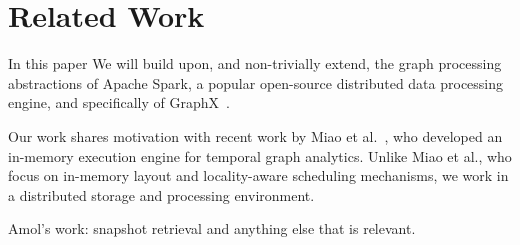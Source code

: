 \section{Related Work}
\label{sec:related}

In this paper We will build upon, and non-trivially extend, the graph
processing abstractions of Apache Spark, a popular open-source
distributed data processing engine, and specifically of
GraphX~\cite{DBLP:conf/osdi/GonzalezXDCFS14}.  

Our work shares motivation with recent work by Miao et
al.~\cite{DBLP:journals/tos/MiaoHLWYZPCC15}, who developed an
in-memory execution engine for temporal graph analytics.  Unlike Miao
et al., who focus on in-memory layout and locality-aware scheduling
mechanisms, we work in a distributed storage and processing
environment.  

Amol's work: snapshot retrieval and anything else that is relevant.
